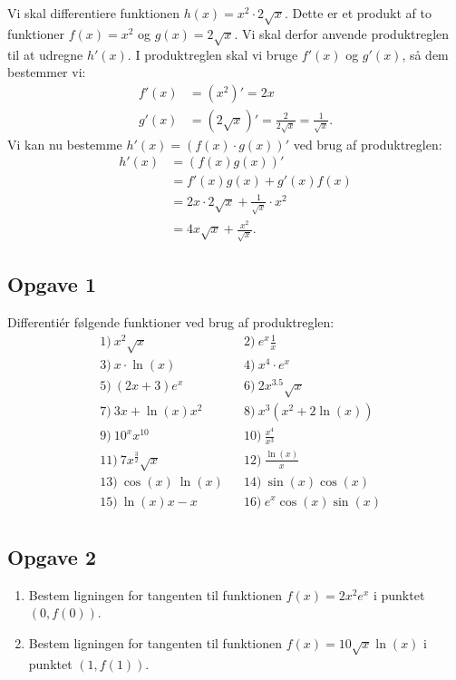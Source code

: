 \begin{exa}
Vi skal differentiere funktionen $h(x) = x^2\cdot 2\sqrt{x}$. Dette er et produkt af to funktioner
$f(x) = x^2$ og $g(x)= 2\sqrt{x}$. Vi skal derfor anvende produktreglen til at udregne $h'(x)$. I produktreglen skal vi bruge $f'(x)$ og $g'(x)$, så dem bestemmer vi:
\begin{align*}
f'(x) &= (x^2)' = 2x\\
g'(x) &= (2\sqrt{x})' = \frac{2}{2\sqrt{x}} = \frac{1}{\sqrt{x}}.
\end{align*} 
Vi kan nu bestemme $h'(x) = (f(x)\cdot g(x))'$ ved brug af produktreglen:
\begin{align*}
h'(x) &= (f(x)g(x))' \\
&= f'(x)g(x)+g'(x)f(x) \\
&= 2x\cdot 2\sqrt{x} + \frac{1}{\sqrt{x}}\cdot x^2\\
&= 4x\sqrt{x} + \frac{x^2}{\sqrt{x}}.
\end{align*}
\end{exa}

\subsection*{Opgave 1}
Differentiér følgende funktioner ved brug af produktreglen:
\begin{align*}
&1) \   x^2\sqrt{x}   &&2) \  e^x\frac{1}{x}     \\
&3) \  x\cdot \ln(x)  &&4) \  x^4\cdot e^x	\\
&5) \   (2x+3)e^x  &&6) \   2x^{3.5}\sqrt{x}    \\
&7) \  3x + \ln(x)x^2    &&8) \ x^3(x^2+2\ln(x))      \\
&9) \  10^xx^{10}    &&10) \  \frac{x^4}{x^3}     \\
&11) \   7x^{\frac{3}{2}}\sqrt{x}   &&12) \     \frac{\ln(x)}{x}   \\
&13) \ \cos(x)\ \ln(x) &&14) \ \sin(x)\cos(x)  \\
&15) \ \ln(x)x - x  &&16) \ e^x\cos(x) \sin(x)  \\
\end{align*}

\subsection*{Opgave 2}
\begin{enumerate}[label=\roman*)]
\item Bestem ligningen for tangenten til funktionen $f(x)=2x^2e^x$ i punktet $(0,f(0))$.
\item Bestem ligningen for tangenten til funktionen $f(x) = 10\sqrt{x}\ln(x)$ i punktet $(1,f(1))$.
\end{enumerate}

